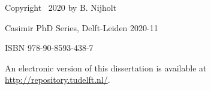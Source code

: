 \begin{titlepage}
\vspace{1\bigskipamount}

\noindent Copyright \textcopyright\ 2020 by B. Nijholt

\medskip
\noindent Casimir PhD Series, Delft-Leiden 2020-11

\medskip
\noindent ISBN 978-90-8593-438-7

\medskip
\noindent An electronic version of this dissertation is available at \\
\url{http://repository.tudelft.nl/}.

\end{titlepage}
